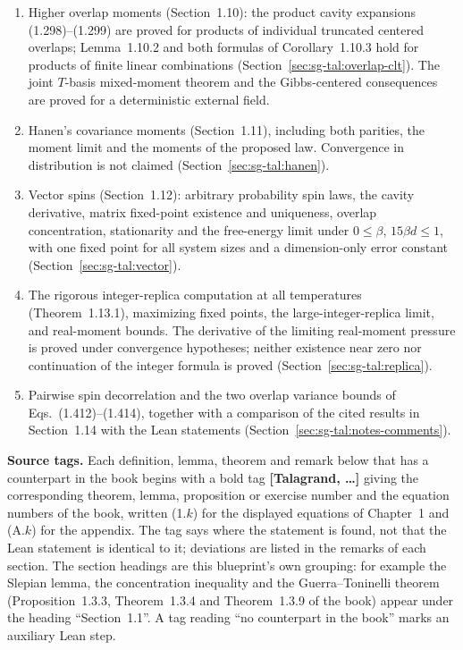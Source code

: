\begin{enumerate}
\item Higher overlap moments (Section~1.10): the product cavity expansions (1.298)--(1.299)
are proved for products of individual truncated centered overlaps; Lemma~1.10.2 and both
formulas of Corollary~1.10.3 hold for products of finite linear combinations
(Section~\ref{sec:sg-tal:overlap-clt}). The joint $T$-basis mixed-moment theorem and the Gibbs-centered consequences are proved for a deterministic external field.
\item Hanen's covariance moments (Section~1.11), including both parities, the moment limit and the moments of the proposed law. Convergence in distribution is not claimed (Section~\ref{sec:sg-tal:hanen}).
\item Vector spins (Section~1.12): arbitrary probability spin laws, the cavity derivative,
matrix fixed-point existence and uniqueness, overlap concentration, stationarity and the
free-energy limit under $0\le\beta$, $15\beta d\le1$, with one fixed point for all
system sizes and a dimension-only error constant (Section~\ref{sec:sg-tal:vector}).
\item The rigorous integer-replica computation at all temperatures (Theorem~1.13.1), maximizing fixed points, the large-integer-replica limit, and real-moment bounds. The derivative of the limiting real-moment pressure is proved under convergence hypotheses; neither existence near zero nor continuation of the integer formula is proved (Section~\ref{sec:sg-tal:replica}).
\item Pairwise spin decorrelation and the two overlap variance bounds of Eqs.~(1.412)--(1.414), together with a comparison of the cited results in Section~1.14 with the Lean statements (Section~\ref{sec:sg-tal:notes-comments}).
\end{enumerate}

\medskip\noindent\textbf{Source tags.}
Each definition, lemma, theorem and remark below that has a counterpart in the book begins with a bold tag \textbf{[Talagrand, \dots]} giving the corresponding theorem, lemma, proposition or exercise number and the equation numbers of the book, written (1.$k$) for the displayed equations of Chapter~1 and (A.$k$) for the appendix. The tag says where the statement is found, not that the Lean statement is identical to it; deviations are listed in the remarks of each section. The section headings are this blueprint's own grouping: for example the Slepian lemma, the concentration inequality and the Guerra--Toninelli theorem (Proposition~1.3.3, Theorem~1.3.4 and Theorem~1.3.9 of the book) appear under the heading ``Section~1.1''. A tag reading ``no counterpart in the book'' marks an auxiliary Lean step.

